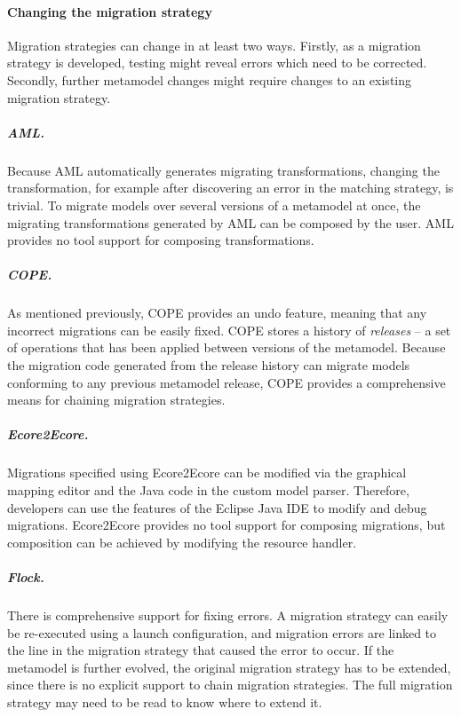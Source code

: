 \paragraph{Changing the migration strategy}
Migration strategies can change in at least two ways. Firstly, as a migration strategy is developed, testing might reveal errors which need to be corrected. Secondly, further metamodel changes might require changes to an existing migration strategy.

\subparagraph{AML.}  Because AML automatically generates migrating transformations, changing the transformation, for example after discovering an error in the matching strategy, is trivial. To migrate models over several versions of a metamodel at once, the migrating transformations generated by AML can be composed by the user. AML provides no tool support for composing transformations.

\subparagraph{COPE.} As mentioned previously, COPE provides an undo feature,
meaning that any incorrect migrations can be easily fixed. COPE stores a history of \emph{releases} -- a set of operations that has been applied between versions of the metamodel. Because the migration code generated from the release history can migrate models conforming to any previous metamodel release, COPE provides a comprehensive means for chaining migration strategies. 

\subparagraph{Ecore2Ecore.} Migrations specified using Ecore2Ecore can be modified via the graphical mapping editor and the Java code in the custom model parser. Therefore, developers can use the features of the Eclipse Java IDE to modify and debug migrations. Ecore2Ecore provides no tool support for composing migrations, but composition can be achieved by modifying the resource handler.

\subparagraph{Flock.} There is comprehensive support for fixing errors. A migration strategy can easily be re-executed using a launch configuration, and migration errors are linked to the line in the migration strategy that caused the error to occur. If the metamodel is further evolved, the original migration strategy has to be extended, since there is no explicit support to chain migration strategies. The full migration strategy may need to be read to know where to extend it.



